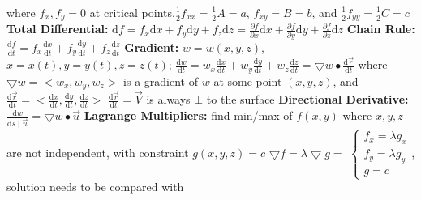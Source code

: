 \documentclass[twoside]{article}
\begin{document}
\indent where $f_x,f_y=0$ at critical points,$\frac{1}{2}f_{xx}=\frac{1}{2}A=a$, $f_{xy}=B=b$, and $\frac{1}{2}f_{yy}=\frac{1}{2}C=c$\newline
\textbf{Total Differential:} $\mathrm{d}f=f_x\mathrm{d}x+f_y\mathrm{d}y+f_z\mathrm{d}z=\frac{\partial{f}}{\partial{x}}\mathrm{d}x+\frac{\partial{f}}{\partial{y}}\mathrm{d}y+\frac{\partial{f}}{\partial{z}}\mathrm{d}z$\newline
\textbf{Chain Rule:} $\frac{\mathrm{d}f}{\mathrm{d}t}=f_x\frac{\mathrm{d}x}{\mathrm{d}t}+f_y\frac{\mathrm{d}y}{\mathrm{d}t}+f_z\frac{\mathrm{d}z}{\mathrm{d}t}$\newline
\textbf{Gradient:} $w=w(x,y,z)$, $x=x(t),y=y(t),z=z(t)$; $\frac{\mathrm{d}w}{\mathrm{d}t}=w_x\frac{\mathrm{d}x}{\mathrm{d}t}+w_y\frac{\mathrm{d}y}{\mathrm{d}t}+w_z\frac{\mathrm{d}z}{\mathrm{d}t}=\bigtriangledown{w}\bullet\frac{\mathrm{d}\vec{r}}{\mathrm{d}t}$ \newline
\indent where $\bigtriangledown{w}=<w_x,w_y,w_z>$ is a gradient of $w$ at some point $(x,y,z)$, and $\frac{\mathrm{d}\vec{r}}{\mathrm{d}t}=<\frac{\mathrm{d}x}{\mathrm{d}t},\frac{\mathrm{d}y}{\mathrm{d}t},\frac{\mathrm{d}z}{\mathrm{d}t}>$\newline
\indent $\frac{\mathrm{d}\vec{r}}{\mathrm{d}t}=\vec{V}$ is always $\bot$ to the surface \newline
\textbf{Directional Derivative:} $\displaystyle \frac{\mathrm{d}w}{\mathrm{d}s\mid\vec{u}} = \bigtriangledown{w}\bullet\vec{u}$\newline
\textbf{Lagrange Multipliers:} find min/max of $f(x,y)$ where $x,y,z$ are not independent, with constraint $g(x,y,z)=c$\newline
\indent $\bigtriangledown{f}=\lambda \bigtriangledown{g} =$
$\left\{ 
  \begin{array}{l}
	f_x=\lambda g_x\\
	f_y=\lambda g_y\\
	g = c
  \end{array}
\right.$, solution needs to be compared with  \newline
\end{document}
